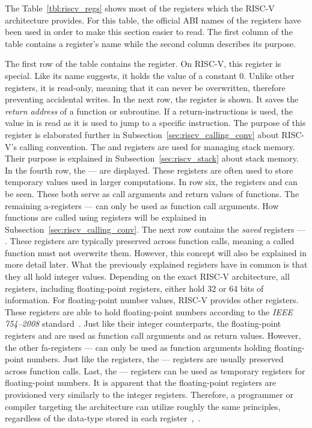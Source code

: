 The Table~\ref{tbl:riscv_regs} shows most of the registers which the RISC-V architecture provides.
For this table, the official ABI names of the registers have been used in order to make this section easier to read.
The first column of the table contains a register's name while the second column describes its purpose.

The first row of the table contains the  register.
On RISC-V, this register is special.
Like its name suggests, it holds the value of a constant 0.
Unlike other registers, it is read-only, meaning that it can never be overwritten, therefore preventing accidental writes.
In the next row, the  register is shown.
It saves the \emph{return address} of a function or subroutine.
If a return-instructions is used, the value in  is read as it is used to jump to a specific instruction.
The purpose of this register is elaborated further in Subsection~\ref{sec:riscv_calling_conv} about RISC-V's calling convention.
The  and  registers are used for managing stack memory.
Their purpose is explained in Subsection~\ref{sec:riscv_stack} about stack memory.
In the fourth row, the  —  are displayed.
These registers are often used to store temporary values used in larger computations.
In row six, the registers  and  can be seen.
These both serve as call arguments and return values of functions.
The remaining a-registers  —  can only be used as function call arguments.
How functions are called using registers will be explained in Subsection~\ref{sec:riscv_calling_conv}.
The next row contains the \emph{saved} registers  — .
These registers are typically preserved across function calls, meaning a called function must not overwrite them.
However, this concept will also be explained in more detail later. 
What the previously explained registers have in common is that they all hold integer values.
Depending on the exact RISC-V architecture, all registers, including floating-point registers, either hold 32 or 64 bits of information.
For floating-point number values, RISC-V provides other registers.
These registers are able to hold floating-point numbers according to the \emph{IEEE 754--2008} standard~\cite[Chapter~11]{Waterman2019}.
Just like their integer counterparts, the floating-point registers  and  are used as function call arguments and as return values.
However, the other fa-registers  —  can only be used as function arguments holding floating-point numbers.
Just like the  registers, the  —  registers are usually preserved across function calls.
Last, the  —  registers can be used as temporary registers for floating-point numbers.
It is apparent that the floating-point registers are provisioned very similarly to the integer registers.
Therefore, a programmer or compiler targeting the architecture can utilize roughly the same principles,
regardless of the data-type stored in each register~\cite[pp.~18f,p.~34]{Patterson2017},~\cite[p~.155]{Waterman2019}.

